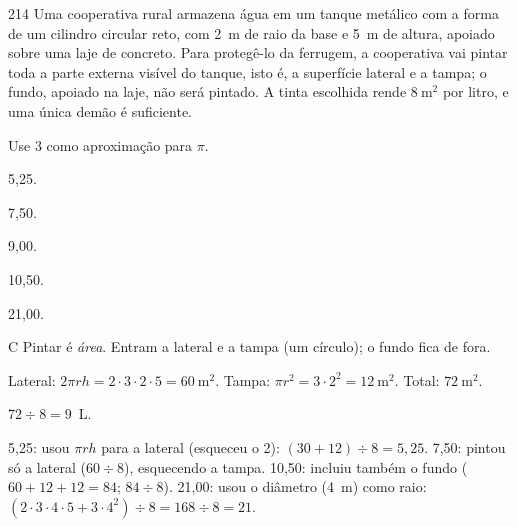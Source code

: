 \begin{questaoinedita}{2}{14}
Uma cooperativa rural armazena água em um tanque metálico com a forma de um
cilindro circular reto, com 2~m de raio da base e 5~m de altura, apoiado sobre
uma laje de concreto. Para protegê-lo da ferrugem, a cooperativa vai pintar toda
a parte externa visível do tanque, isto é, a superfície lateral e a tampa; o
fundo, apoiado na laje, não será pintado. A tinta escolhida rende
$8\ \text{m}^2$ por litro, e uma única demão é suficiente.

Use 3 como aproximação para $\pi$.

\begin{alternativas*}[5]
  \item 5,25.
  \item 7,50.
  \item 9,00.
  \item 10,50.
  \item 21,00.
\end{alternativas*}
\end{questaoinedita}
\begin{resolucao}{C}
 Pintar é \emph{área}. Entram a lateral e a tampa
(um círculo); o fundo fica de fora.

 Lateral: $2\pi r h = 2\cdot 3\cdot 2\cdot 5 = 60\ \text{m}^2$.
Tampa: $\pi r^2 = 3\cdot 2^2 = 12\ \text{m}^2$. Total: $72\ \text{m}^2$.

 $72 \div 8 = 9$~L.

\begin{distratores}
 5,25: usou $\pi r h$ para a lateral (esqueceu o 2):
$(30 + 12)\div 8 = 5{,}25$.
 7,50: pintou só a lateral ($60\div 8$), esquecendo a tampa.
 10,50: incluiu também o fundo ($60 + 12 + 12 = 84$; $84\div 8$).
 21,00: usou o diâmetro (4~m) como raio:
$(2\cdot 3\cdot 4\cdot 5 + 3\cdot 4^2)\div 8 = 168\div 8 = 21$.
\end{distratores}
\end{resolucao}

